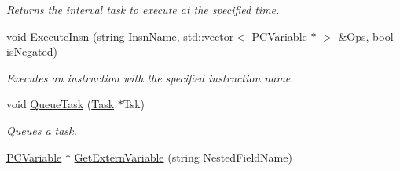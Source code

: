 \begin{DoxyCompactItemize}
\begin{DoxyCompactList}\small\item\em Returns the interval task to execute at the specified time. \end{DoxyCompactList}\item 
void \hyperlink{classpc__emulator_1_1PCResourceImpl_a99fe969205384c1dfbebc9418370d800}{Execute\+Insn} (string Insn\+Name, std\+::vector$<$ \hyperlink{classpc__emulator_1_1PCVariable}{P\+C\+Variable} $\ast$ $>$ \&Ops, bool is\+Negated)
\begin{DoxyCompactList}\small\item\em Executes an instruction with the specified instruction name. \end{DoxyCompactList}\item 
void \hyperlink{classpc__emulator_1_1PCResourceImpl_ab64a9dd6676b818413edc2b690dee265}{Queue\+Task} (\hyperlink{classpc__emulator_1_1Task}{Task} $\ast$Tsk)\hypertarget{classpc__emulator_1_1PCResourceImpl_ab64a9dd6676b818413edc2b690dee265}{}\label{classpc__emulator_1_1PCResourceImpl_ab64a9dd6676b818413edc2b690dee265}

\begin{DoxyCompactList}\small\item\em Queues a task. \end{DoxyCompactList}\item 
\hyperlink{classpc__emulator_1_1PCVariable}{P\+C\+Variable} $\ast$ \hyperlink{classpc__emulator_1_1PCResourceImpl_ae078d93dc866fc2deba248a7c0e1a573}{Get\+Extern\+Variable} (string Nested\+Field\+Name)\hypertarget{classpc__emulator_1_1PCResourceImpl_ae078d93dc866fc2deba248a7c0e1a573}{}\label{classpc__emulator_1_1PCResourceImpl_ae078d93dc866fc2deba248a7c0e1a573}


\end{DoxyCompactItemize}
